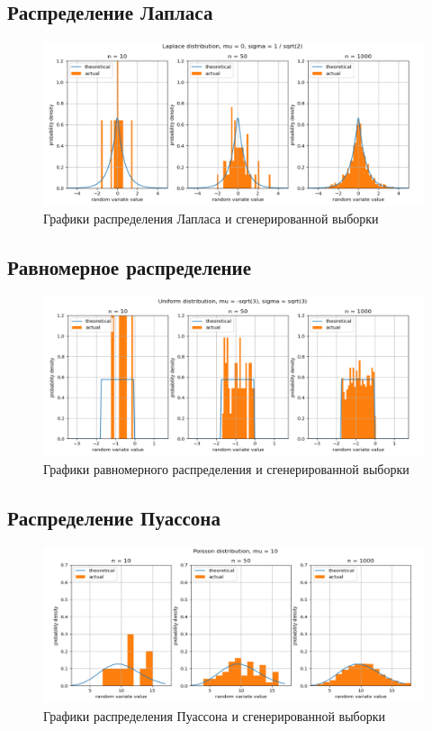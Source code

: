 \documentclass[12pt,a4paper]{article}
\begin{document}
	\subsection{Распределение Лапласа}
		\begin{figure}[h]
			\centering
			\includegraphics[width=\linewidth]{MS1res/laplace.png}
			\caption{Графики распределения Лапласа и сгенерированной выборки}
		\end{figure}
	\newpage
	\subsection{Равномерное распределение}
		\begin{figure}[h]
			\centering
			\includegraphics[width=\linewidth]{MS1res/uniform.png}
			\caption{Графики равномерного распределения и сгенерированной выборки}
		\end{figure}
	\subsection{Распределение Пуассона}
		\begin{figure}[h]
			\centering
			\includegraphics[width=\linewidth]{MS1res/poisson.png}
			\caption{Графики распределения Пуассона и сгенерированной выборки}
		\end{figure}
	\newpage
\end{document}
